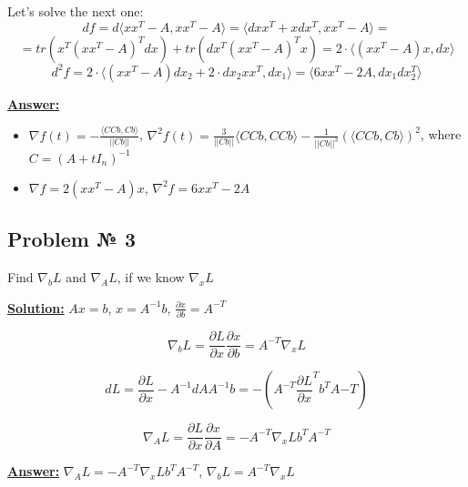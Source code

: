 Let's solve the next one:
\begin{equation*}
    df = d \langle xx^T - A, xx^T - A \rangle = \langle dxx^T + xdx^T, xx^T - A\rangle = 
\end{equation*}
\begin{equation*}
    = tr(x^T(xx^T - A)^Tdx) + tr(dx^T(xx^T-A)^Tx) = 
    2 \cdot \langle (xx^T -A)x, dx\rangle
\end{equation*}
\begin{equation*}
    d^2f = 2 \cdot \langle (xx^T -A)dx_2 + 2\cdot dx_2 xx^T, dx_1\rangle = \langle 6xx^T-2A, dx_1dx_2^T \rangle
\end{equation*}


\underline{\textbf{Answer:}} 
\begin{itemize}
    \item $\nabla f(t) =-\frac{\langle CCb, Cb \rangle}{||Cb||}$, $\nabla^2f(t) = \frac{3}{||Cb||}\langle CCb, CCb\rangle - \frac{1}{||Cb||^3 }(\langle CCb, Cb \rangle)^2$, where $C = (A+tI_n)^{-1}$
    \item $\nabla f = 2(xx^T -A)x$, $\nabla^2f = 6xx^T-2A$
\end{itemize}


\subsection{Problem № 3} 
Find $\nabla_b L$ and $\nabla_A L$, if we know $\nabla_x L$


\underline{\textbf{Solution:}} 
$Ax = b$, $x = A^{-1}b$, $\frac{\partial x}{\partial b} = A^{-T}$

\begin{equation*}
    \nabla_b L = \frac{\partial L}{\partial x} \frac{\partial x}{\partial b} = A^{-T}\nabla_x L 
\end{equation*}

\begin{equation*}
    dL = \frac{\partial L}{\partial x} -A^{-1}dA A^{-1}b = - (A^{-T}\frac{\partial L}{\partial x}^T b^TA{-T})
\end{equation*}

\begin{equation*}
    \nabla_A L = \frac{\partial L}{\partial x} \frac{\partial x}{\partial A} = - A^{-T} \nabla_x L b^TA^{-T}
\end{equation*}

\underline{\textbf{Answer:}} $ \nabla_A L = - A^{-T} \nabla_x L b^TA^{-T}$, $\nabla_b L = A^{-T}\nabla_x L$

